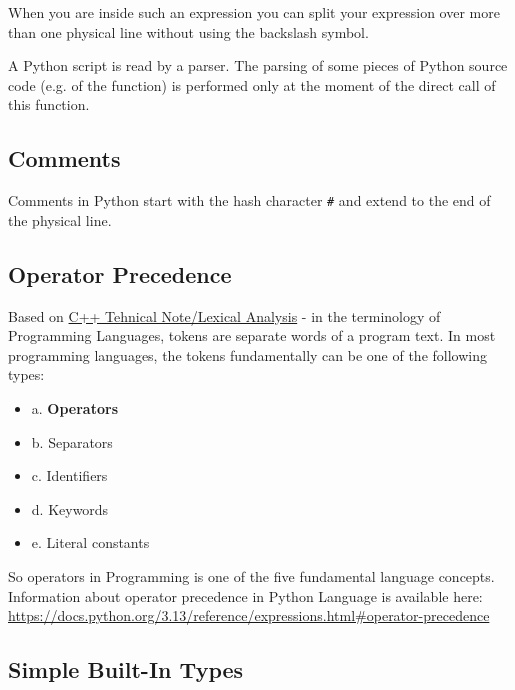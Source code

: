 \documentclass[
]{article}
\begin{document}
When you are inside such an expression you can split your expression
over more than one physical line without using the backslash symbol.

A Python script is read by a parser. The parsing of some pieces of
Python source code (e.g. of the function) is performed only at the
moment of the direct call of this function.

\hypertarget{comments}{%
\subsection{Comments}\label{comments}}

Comments in Python start with the hash character \texttt{\#} and extend
to the end of the physical line.

\hypertarget{operator-precedence}{%
\subsection{Operator Precedence}\label{operator-precedence}}

Based on
\href{https://github.com/burlachenkok/CPP_from_1998_to_2020/blob/main/Cpp-Technical-Note.md\#lexical-analysis}{C++
Tehnical Note/Lexical Analysis} - in the terminology of Programming
Languages, tokens are separate words of a program text. In most
programming languages, the tokens fundamentally can be one of the
following types:

\begin{itemize}
\item
  a. \textbf{Operators}
\item
  b. Separators
\item
  c. Identifiers
\item
  d. Keywords
\item
  e. Literal constants
\end{itemize}

So operators in Programming is one of the five fundamental language
concepts. Information about operator precedence in Python Language is
available here:\\
\url{https://docs.python.org/3.13/reference/expressions.html\#operator-precedence}

\hypertarget{simple-built-in-types}{%
\subsection{Simple Built-In Types}\label{simple-built-in-types}}
\end{document}
